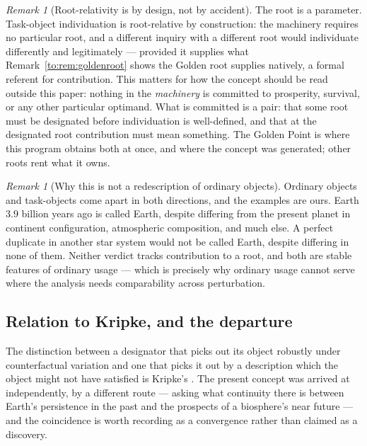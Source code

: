 \documentclass[11pt]{article}
\numberwithin{equation}{section}
\theoremstyle{plain}
\theoremstyle{definition}
\theoremstyle{remark}
\newtheorem{remark}[theorem]{Remark}
\begin{document}
\begin{remark}[Root-relativity is by design, not by accident]
\label{to:rem:rootrelative}
The root is a parameter. Task-object individuation is root-relative by
construction: the machinery requires no particular root, and a
different inquiry with a different root would individuate differently
and legitimately --- provided it supplies what
Remark~\ref{to:rem:goldenroot} shows the Golden root supplies
natively, a formal referent for contribution. This matters for how the
concept should be read outside this paper: nothing in the
\emph{machinery} is committed to prosperity, survival, or any other
particular optimand. What is committed is a pair: that some root must
be designated before individuation is well-defined, and that at the
designated root contribution must mean something. The Golden Point is
where this program obtains both at once, and where the concept was
generated; other roots rent what it owns.
\end{remark}

\begin{remark}[Why this is not a redescription of ordinary objects]
\label{to:rem:notredescription}
Ordinary objects and task-objects come apart in both directions, and the
examples are ours. Earth $3.9$ billion years ago is called
Earth, despite differing from the present planet in continent
configuration, atmospheric composition, and much else. A perfect
duplicate in another star system would not be called Earth, despite
differing in none of them. Neither verdict tracks contribution to a
root, and both are stable features of ordinary usage --- which is
precisely why ordinary usage cannot serve where the analysis needs
comparability across perturbation.
\end{remark}

\subsection{Relation to Kripke, and the departure}\label{to:sub:kripke}

The distinction between a designator that picks out its object robustly
under counterfactual variation and one that picks it out by a
description which the object might not have satisfied is Kripke's
\cite{kripke1980naming}. The present concept was arrived at independently, by a
different route --- asking what continuity there is between Earth's
persistence in the past and the prospects of a biosphere's near future
--- and the coincidence is worth recording as a convergence rather than
claimed as a discovery.
\end{document}
